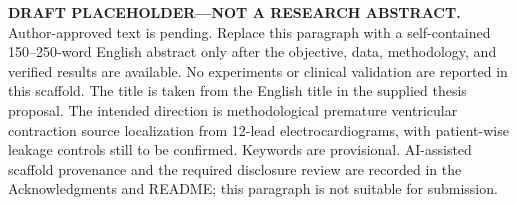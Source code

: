 \textbf{DRAFT PLACEHOLDER---NOT A RESEARCH ABSTRACT.} Author-approved text is pending. Replace this paragraph with a self-contained 150--250-word English abstract only after the objective, data, methodology, and verified results are available. No experiments or clinical validation are reported in this scaffold. The title is taken from the English title in the supplied thesis proposal. The intended direction is methodological premature ventricular contraction source localization from 12-lead electrocardiograms, with patient-wise leakage controls still to be confirmed. Keywords are provisional. AI-assisted scaffold provenance and the required disclosure review are recorded in the Acknowledgments and README; this paragraph is not suitable for submission.
